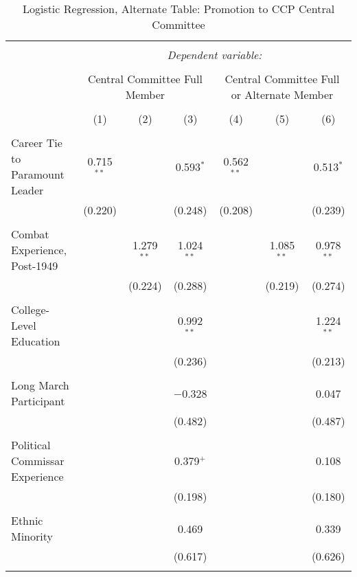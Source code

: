 \documentclass[12pt,letterpaper]{article}
\begin{document}
\begin{table}[!htbp] \centering 
	\caption{Logistic Regression, Alternate Table: Promotion to CCP Central Committee} 
	\label{table_a9} 
	\begin{tabular}{@{\extracolsep{5pt}}lcccccc} 
		\\[-1.8ex]\hline 
		\hline \\[-1.8ex] 
		& \multicolumn{6}{c}{\textit{Dependent variable:}} \\ 
		\cline{2-7} 
		\\[-1.8ex] & \multicolumn{3}{c}{Central Committee Full Member} & \multicolumn{3}{c}{Central Committee Full or Alternate Member} \\ 
		\\[-1.8ex] & (1) & (2) & (3) & (4) & (5) & (6)\\ 
		\hline \\[-1.8ex] 
		Career Tie to Paramount Leader & 0.715$^{**}$ &  & 0.593$^{*}$ & 0.562$^{**}$ &  & 0.513$^{*}$ \\ 
		& (0.220) &  & (0.248) & (0.208) &  & (0.239) \\ 
		& & & & & & \\ 
		Combat Experience, Post-1949 &  & 1.279$^{**}$ & 1.024$^{**}$ &  & 1.085$^{**}$ & 0.978$^{**}$ \\ 
		&  & (0.224) & (0.288) &  & (0.219) & (0.274) \\ 
		& & & & & & \\ 
		College-Level Education &  &  & 0.992$^{**}$ &  &  & 1.224$^{**}$ \\ 
		&  &  & (0.236) &  &  & (0.213) \\ 
		& & & & & & \\ 
		Long March Participant &  &  & $-$0.328 &  &  & 0.047 \\ 
		&  &  & (0.482) &  &  & (0.487) \\ 
		& & & & & & \\ 
		Political Commissar Experience &  &  & 0.379$^{+}$ &  &  & 0.108 \\ 
		&  &  & (0.198) &  &  & (0.180) \\ 
		& & & & & & \\ 
		Ethnic Minority &  &  & 0.469 &  &  & 0.339 \\ 
		&  &  & (0.617) &  &  & (0.626) \\ 
		& & & & & & \\ 

\end{tabular}
\end{table}
\end{document}
